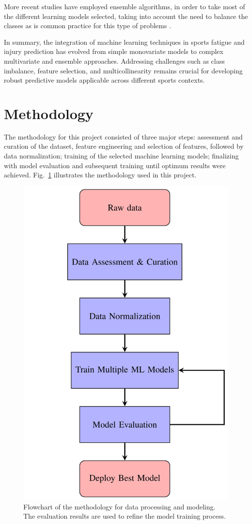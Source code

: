 \documentclass[conference]{IEEEtran}
\begin{document}
More recent studies have employed ensemble algorithms, in order to take most of the different learning models selected, taking into account the need to balance the classes as is common practice for this type of problems \cite{lopez2018preventive}. 

In summary, the integration of machine learning techniques in sports fatigue and injury prediction has evolved from simple monovariate models to complex multivariate and ensemble approaches. Addressing challenges such as class imbalance, feature selection, and multicollinearity remains crucial for developing robust predictive models applicable across different sports contexts.

\section{Methodology}

The methodology for this project consisted of three major steps: assessment and curation of the dataset, feature engineering and selection of features, followed by data normalization; training of the selected machine learning models; finalizing with model evaluation and subsequent training until optimum results were achieved. Fig.~\ref{fig:methodology} illustrates the methodology used in this project.

\begin{figure}[h]
\centering
\includegraphics[width=0.72\linewidth]{output2.png}
\caption{Flowchart of the methodology for data processing and modeling. The evaluation results are used to refine the model training process.}
\label{fig:methodology}
\end{figure}
\end{document}
